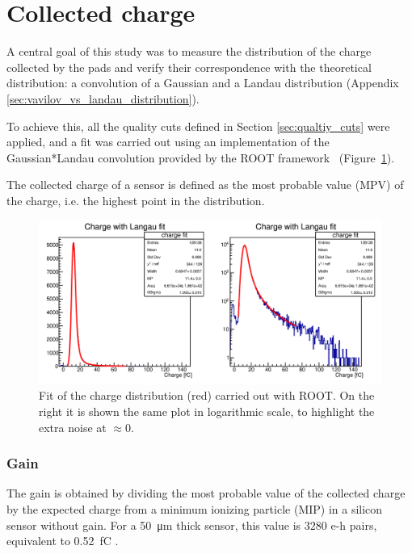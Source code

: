 \section{Collected charge}\label{sec:methods_collected_charge}

A central goal of this study was to measure the distribution of the charge collected by the pads and verify their correspondence with the theoretical distribution: a convolution of a Gaussian and a Landau distribution (Appendix \ref{sec:vavilov_vs_landau_distribution}).

To achieve this, all the quality cuts defined in Section \ref{sec:qualtiy_cuts} were applied, and a fit was carried out using an implementation of the Gaussian*Landau convolution provided by the ROOT framework~\cite{Brun:1997pa} (Figure~\ref{fig:charge_ROOT_fit}).

The collected charge of a sensor is defined as the most probable value (MPV) of the charge, i.e. the highest point in the distribution.

\begin{figure}[h!tbp]
    \centering
    \includegraphics[width=1\linewidth]{Images/charge_plots/charge_data_all_cuts_401_S1_3_Charge_fit_ROOT_double_plot.png}
    \captionsetup{width=\captionwidth}
    \caption{Fit of the charge distribution (red) carried out with ROOT. On the right it is shown the same plot in logarithmic scale, to highlight the extra noise at \(\approx 0\).}
    \label{fig:charge_ROOT_fit}
\end{figure}

\subsubsection{Gain}
The gain is obtained by dividing the most probable value of the collected charge by the expected charge from a minimum ionizing particle (MIP) in a silicon sensor without gain. For a \qty{50}{\micro\meter} thick sensor, this value is \(3280\) e-h pairs, equivalent to \qty{.52}{\femto\coulomb} \cite{meroli_energy_loss2011}.

